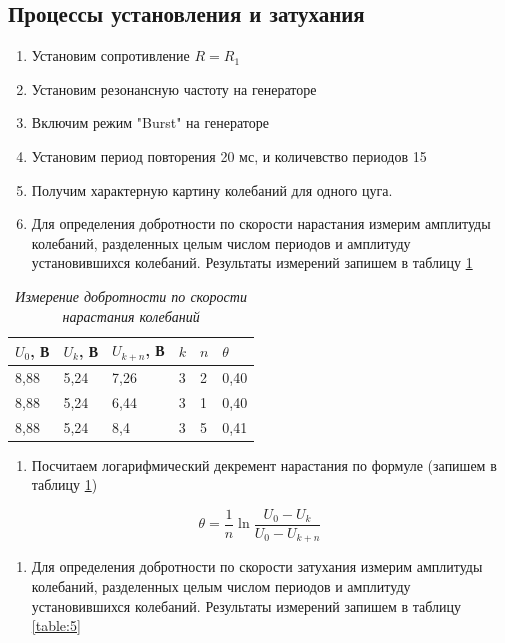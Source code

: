 \documentclass[a4paper,12pt]{article}
\begin{document}
\subsection{Процессы установления и затухания}

\begin{enumerate}
    \item Установим сопротивление $R = R_1$
    \item Установим резонансную частоту на генераторе
    \item Включим режим "Burst" на генераторе
    \item Установим период повторения 20 мс, и количевство периодов 15
    \item Получим характерную картину колебаний для одного цуга.
    \item Для определения добротности по скорости нарастания измерим амплитуды колебаний, разделенных целым числом периодов и амплитуду установившихся колебаний. Результаты измерений запишем в таблицу \ref{table:4}
\end{enumerate}

\begin{table}[!ht]
    \centering
    \begin{tabular}{|l|l|l|l|l|l|}
    \hline
        $U_0$, В & $U_k$, В & $U_{k + n}$, В & $k$ & $n$ & $\theta$ \\ \hline
        8,88 & 5,24 & 7,26 & 3 & 2 & 0,40 \\ \hline
        8,88 & 5,24 & 6,44 & 3 & 1 & 0,40 \\ \hline
        8,88 & 5,24 & 8,4 & 3 & 5 & 0,41 \\ \hline
    \end{tabular}\caption{\textit{Измерение добротности по скорости нарастания колебаний}}\label{table:4}
\end{table}

\FloatBarrier

\begin{enumerate}[resume]
    \item Посчитаем логарифмический декремент нарастания по формуле (запишем в таблицу \ref{table:4})
\end{enumerate}

\begin{equation*}
    \theta = \frac{1}{n} \ln{\frac{U_0 - U_k}{U_0 - U_{k + n}}}
\end{equation*}

\begin{enumerate}[resume]
    \item Для определения добротности по скорости затухания измерим амплитуды колебаний, разделенных целым числом периодов и амплитуду установившихся колебаний. Результаты измерений запишем в таблицу \ref{table:5}
\end{enumerate}
\end{document}
